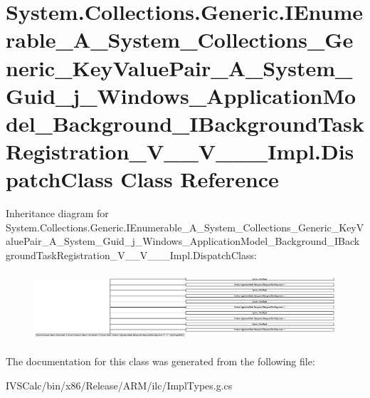 \hypertarget{class_system_1_1_collections_1_1_generic_1_1_i_enumerable___a___system___collections___generic__3a1c5a743c361e2c96d3aaaf59e45e58}{}\section{System.\+Collections.\+Generic.\+I\+Enumerable\+\_\+\+A\+\_\+\+System\+\_\+\+Collections\+\_\+\+Generic\+\_\+\+Key\+Value\+Pair\+\_\+\+A\+\_\+\+System\+\_\+\+Guid\+\_\+j\+\_\+\+Windows\+\_\+\+Application\+Model\+\_\+\+Background\+\_\+\+I\+Background\+Task\+Registration\+\_\+\+V\+\_\+\+\_\+\+V\+\_\+\+\_\+\+\_\+\+Impl.\+Dispatch\+Class Class Reference}
\label{class_system_1_1_collections_1_1_generic_1_1_i_enumerable___a___system___collections___generic__3a1c5a743c361e2c96d3aaaf59e45e58}
Inheritance diagram for System.\+Collections.\+Generic.\+I\+Enumerable\+\_\+\+A\+\_\+\+System\+\_\+\+Collections\+\_\+\+Generic\+\_\+\+Key\+Value\+Pair\+\_\+\+A\+\_\+\+System\+\_\+\+Guid\+\_\+j\+\_\+\+Windows\+\_\+\+Application\+Model\+\_\+\+Background\+\_\+\+I\+Background\+Task\+Registration\+\_\+\+V\+\_\+\+\_\+\+V\+\_\+\+\_\+\+\_\+\+Impl.\+Dispatch\+Class\+:\begin{figure}[H]
\begin{center}
\leavevmode
\includegraphics[height=2.573099cm]{class_system_1_1_collections_1_1_generic_1_1_i_enumerable___a___system___collections___generic__3a1c5a743c361e2c96d3aaaf59e45e58}
\end{center}
\end{figure}


The documentation for this class was generated from the following file\+:\begin{DoxyCompactItemize}
\item 
I\+V\+S\+Calc/bin/x86/\+Release/\+A\+R\+M/ilc/Impl\+Types.\+g.\+cs\end{DoxyCompactItemize}
